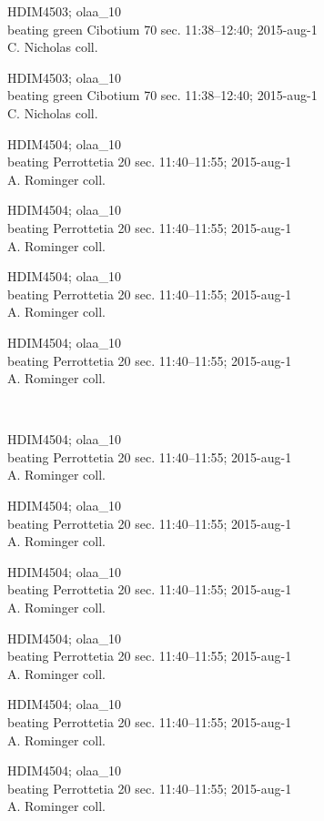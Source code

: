 \documentclass[2pt]{extarticle}
\begin{document}
\noindent
\parbox{0.16\textwidth}{\tiny \raggedright \rule[-0.3\baselineskip]{0pt}{10pt}HDIM4503; olaa\_10\\ beating green Cibotium 70 sec. 11:38--12:40; 2015-aug-1\\ C. Nicholas coll.}
\parbox{0.16\textwidth}{\tiny \raggedright \rule[-0.3\baselineskip]{0pt}{10pt}HDIM4503; olaa\_10\\ beating green Cibotium 70 sec. 11:38--12:40; 2015-aug-1\\ C. Nicholas coll.}
\parbox{0.16\textwidth}{\tiny \raggedright \rule[-0.3\baselineskip]{0pt}{10pt}HDIM4504; olaa\_10\\ beating Perrottetia 20 sec. 11:40--11:55; 2015-aug-1\\ A. Rominger coll.}
\parbox{0.16\textwidth}{\tiny \raggedright \rule[-0.3\baselineskip]{0pt}{10pt}HDIM4504; olaa\_10\\ beating Perrottetia 20 sec. 11:40--11:55; 2015-aug-1\\ A. Rominger coll.}
\parbox{0.16\textwidth}{\tiny \raggedright \rule[-0.3\baselineskip]{0pt}{10pt}HDIM4504; olaa\_10\\ beating Perrottetia 20 sec. 11:40--11:55; 2015-aug-1\\ A. Rominger coll.}
\parbox{0.16\textwidth}{\tiny \raggedright \rule[-0.3\baselineskip]{0pt}{10pt}HDIM4504; olaa\_10\\ beating Perrottetia 20 sec. 11:40--11:55; 2015-aug-1\\ A. Rominger coll.} \\ 
\vspace{0.001in} 

\noindent
\parbox{0.16\textwidth}{\tiny \raggedright \rule[-0.3\baselineskip]{0pt}{10pt}HDIM4504; olaa\_10\\ beating Perrottetia 20 sec. 11:40--11:55; 2015-aug-1\\ A. Rominger coll.}
\parbox{0.16\textwidth}{\tiny \raggedright \rule[-0.3\baselineskip]{0pt}{10pt}HDIM4504; olaa\_10\\ beating Perrottetia 20 sec. 11:40--11:55; 2015-aug-1\\ A. Rominger coll.}
\parbox{0.16\textwidth}{\tiny \raggedright \rule[-0.3\baselineskip]{0pt}{10pt}HDIM4504; olaa\_10\\ beating Perrottetia 20 sec. 11:40--11:55; 2015-aug-1\\ A. Rominger coll.}
\parbox{0.16\textwidth}{\tiny \raggedright \rule[-0.3\baselineskip]{0pt}{10pt}HDIM4504; olaa\_10\\ beating Perrottetia 20 sec. 11:40--11:55; 2015-aug-1\\ A. Rominger coll.}
\parbox{0.16\textwidth}{\tiny \raggedright \rule[-0.3\baselineskip]{0pt}{10pt}HDIM4504; olaa\_10\\ beating Perrottetia 20 sec. 11:40--11:55; 2015-aug-1\\ A. Rominger coll.}
\parbox{0.16\textwidth}{\tiny \raggedright \rule[-0.3\baselineskip]{0pt}{10pt}HDIM4504; olaa\_10\\ beating Perrottetia 20 sec. 11:40--11:55; 2015-aug-1\\ A. Rominger coll.} \\ 
\vspace{0.001in} 
\end{document}
